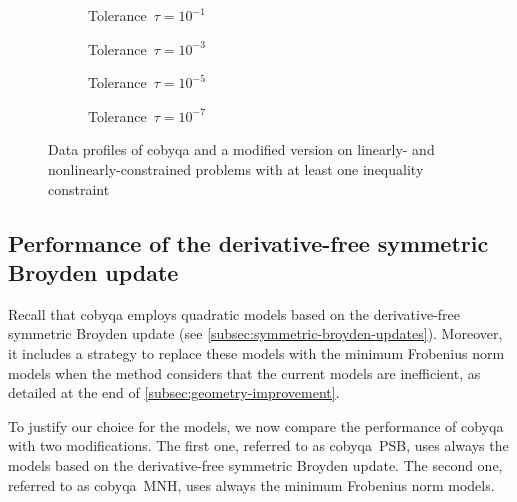 \begin{figure}[ht]
    \centering
    \begin{subfigure}[b]{0.49\textwidth}
        \centering
        \caption{Tolerance~$\tau = 10^{-1}$}
    \end{subfigure}
    \hfill
    \begin{subfigure}[b]{0.49\textwidth}
        \centering
        \caption{Tolerance~$\tau = 10^{-3}$}
    \end{subfigure}
    \begin{subfigure}[b]{0.49\textwidth}
        \centering
        \caption{Tolerance~$\tau = 10^{-5}$}
    \end{subfigure}
    \hfill
    \begin{subfigure}[b]{0.49\textwidth}
        \centering
        \caption{Tolerance~$\tau = 10^{-7}$}
    \end{subfigure}
    \caption{Data profiles of \gls{cobyqa} and a modified version on linearly- and nonlinearly-constrained problems with at least one inequality constraint}
    \label{fig:data-byrd-omojokun}
\end{figure}

\subsection{Performance of the derivative-free symmetric Broyden update}
\label{subsec:alternative-models}

Recall that \gls{cobyqa} employs quadratic models based on the derivative-free symmetric Broyden update (see \cref{subsec:symmetric-broyden-updates}).
Moreover, it includes a strategy to replace these models with the minimum Frobenius norm models when the method considers that the current models are inefficient, as detailed at the end of \cref{subsec:geometry-improvement}.

To justify our choice for the models, we now compare the performance of \gls{cobyqa} with two modifications.
The first one, referred to as \gls{cobyqa}~PSB, uses always the models based on the derivative-free symmetric Broyden update.
The second one, referred to as \gls{cobyqa}~MNH, uses always the minimum Frobenius norm models.

